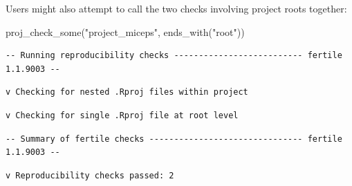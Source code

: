 \documentclass[12pt,twoside]{reedthesis}
\newenvironment{Shaded}{\begin{snugshade}}{\end{snugshade}}
\newcommand{\FunctionTok}[1]{\textcolor[rgb]{0.00,0.00,0.00}{#1}}
\newcommand{\NormalTok}[1]{#1}
\newcommand{\StringTok}[1]{\textcolor[rgb]{0.31,0.60,0.02}{#1}}
\begin{document}
Users might also attempt to call the two checks involving project roots together:
\begin{Shaded}
\begin{Highlighting}[]
\FunctionTok{proj\_check\_some}\NormalTok{(}\StringTok{"project\_miceps"}\NormalTok{, }\FunctionTok{ends\_with}\NormalTok{(}\StringTok{"root"}\NormalTok{))}
\end{Highlighting}
\end{Shaded}
\footnotesize
\begin{verbatim}
-- Running reproducibility checks -------------------------- fertile 1.1.9003 --
\end{verbatim}
\begin{verbatim}
v Checking for nested .Rproj files within project
\end{verbatim}
\begin{verbatim}
v Checking for single .Rproj file at root level
\end{verbatim}
\begin{verbatim}
-- Summary of fertile checks ------------------------------- fertile 1.1.9003 --
\end{verbatim}
\begin{verbatim}
v Reproducibility checks passed: 2
\end{verbatim}
\normalsize
\end{document}
